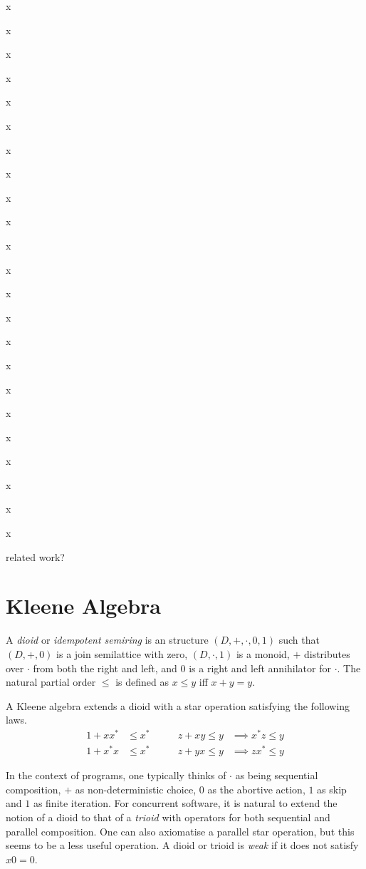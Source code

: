 \documentclass{llncs}
\begin{document}
x

x

x

x

x

x

x

x

x

x

x

x

x

x

x

x

x

x

x

x

x

x

x

related work?

\newpage
\section{Kleene Algebra}
\label{sec:KA}

A \emph{dioid} or \emph{idempotent semiring} is an structure
$(D,+,\cdot,0,1)$ such that $(D,+,0)$ is a join semilattice with zero,
$(D,\cdot,1)$ is a monoid, $+$ distributes over $\cdot$ from both the
right and left, and $0$ is a right and left annihilator for
$\cdot$. The natural partial order $\le$ is defined as $x \le y $ iff
$x + y = y$.

A Kleene algebra extends a dioid with a star operation satisfying the
following laws.
\begin{align*}
  1 + xx^* &\le x^* &\qquad z + xy \le y &\implies x^*z \le y\\
  1 + x^*x &\le x^* &\qquad z + yx \le y &\implies zx^* \le y
\end{align*}

In the context of programs, one typically thinks of $\cdot$ as being
sequential composition, $+$ as non-deterministic choice, $0$ as the
abortive action, $1$ as skip and $1$ as finite iteration. For
concurrent software, it is natural to extend the notion of a dioid to
that of a \emph{trioid} with operators for both sequential and
parallel composition. One can also axiomatise a parallel star
operation, but this seems to be a less useful operation. A
dioid or trioid is \emph{weak} if it does not satisfy $x0 = 0$.
\end{document}
